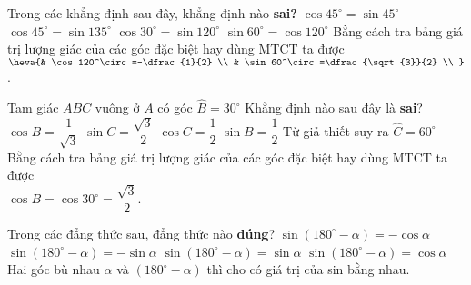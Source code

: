 \begin{ex}%
	Trong các khẳng định sau đây, khẳng định nào \textbf{sai?}
	\choice
	{$\cos 45^\circ=\sin 45^\circ$}
	{$\cos 45^\circ=\sin {135^\circ}$}
	{$\cos 30^\circ=\sin 120^\circ$}
	{\True $\sin 60^\circ=\cos 120^\circ$}
	\loigiai
	{Bằng cách tra bảng giá trị lượng giác của các góc đặc biệt hay dùng MTCT ta được $\heva{& \cos 120^\circ=-\dfrac{1}{2} \\ 
			& \sin 60^\circ=\dfrac{\sqrt{3}}{2} \\ 
		}$.}
\end{ex}
\begin{ex}%
	Tam giác $ABC$ vuông ở $A$ có góc $\widehat{B}=30^\circ$ Khẳng định nào sau đây là \textbf{sai}?
	\choice
	{\True $\cos B=\dfrac{1}{\sqrt{3}}$}
	{$\sin C=\dfrac{\sqrt{3}}{2}$}
	{$\cos C=\dfrac{1}{2}$}
	{$\sin B=\dfrac{1}{2}$}
	\loigiai
	{Từ giả thiết suy ra $\widehat{C}=60^\circ$\\
		Bằng cách tra bảng giá trị lượng giác của các góc đặc biệt hay dùng MTCT ta được\\
		$\cos B=\cos 30^\circ=\dfrac{\sqrt{3}}{2}$.}
\end{ex}

\begin{ex}%
	Trong các đẳng thức sau, đẳng thức nào \textbf{đúng}?
	\choice
	{$\sin (180^\circ -\alpha )=-\cos \alpha $}
	{$\sin (180^\circ -\alpha )=-\sin \alpha $}
	{\True $\sin (180^\circ -\alpha )=\sin \alpha $}
	{$\sin (180^\circ -\alpha )=\cos \alpha $}
	\loigiai
	{Hai góc bù nhau $\alpha $ và $(180^\circ -\alpha )$ thì cho có giá trị của sin bằng nhau.}
\end{ex}

